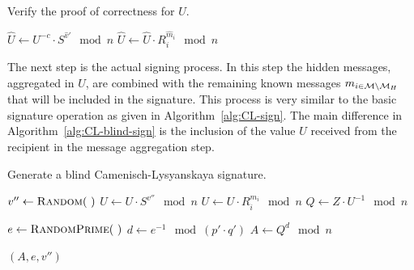 \begin{algorithm}
  \caption{Verify the proof of correctness for $U$.}
  \label{alg:CL-verify-U}
  \addtolength{\baselineskip}{1mm}
  \begin{algorithmic}[1]

      \State $\hat{U} \gets U^{-c} \cdot S^{\hat{v}'} \mod n$
        \State $\hat{U} \gets \hat{U} \cdot R_i^{\hat{m}_i} \mod n$
      \EndFor
        \Return {}
      \EndIf

      \Return {}
    \EndFunction
  \end{algorithmic}
\end{algorithm}

The next step is the actual signing process. In this step the hidden messages,
aggregated in $U$, are combined with the remaining known messages
$m_{i \in \mathcal{M} \setminus \mathcal{M}_H}$ that will be included in the signature. This
process is very similar to the basic signature operation as given in
Algorithm~\ref{alg:CL-sign}. The main difference in
Algorithm~\ref{alg:CL-blind-sign} is the inclusion of the value $U$ received
from the recipient in the message aggregation step.

\begin{algorithm}
  \caption{Generate a blind Camenisch-Lysyanskaya signature.}
  \label{alg:CL-blind-sign}
  \addtolength{\baselineskip}{1mm}
  \begin{algorithmic}[1]

      \State $v'' \gets \Call{Random}{~}$
      \State $U \gets U \cdot S^{v''} \mod n$
        \State $U \gets U \cdot R_i^{m_i} \mod n$
      \EndFor
      \State $Q \gets Z \cdot U^{-1} \mod n$

      \State $e \gets \Call{RandomPrime}{~}$
      \State $d \gets e^{-1} \mod (p' \cdot q')$
      \State $A \gets Q^d \mod n$

      \Return $(A, e, v'')$
    \EndFunction
  \end{algorithmic}
\end{algorithm}


